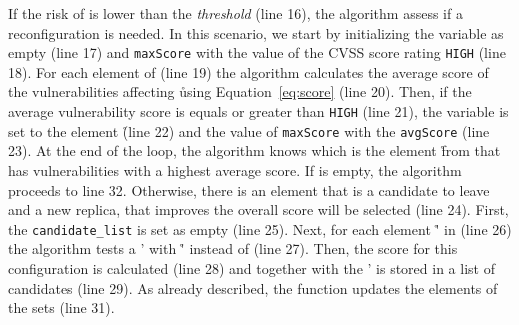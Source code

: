 If the risk of \ES is lower than the \emph{threshold} (line 16), the algorithm assess if a reconfiguration is needed.
In this scenario, we start by initializing the variable \toRemove as empty (line 17) and \texttt{maxScore} with the value of the CVSS score rating \texttt{HIGH} (line 18).
For each element of \ES (line 19) the algorithm calculates the average score of the vulnerabilities affecting \r using Equation~\ref{eq:score} (line 20).
Then, if the average vulnerability score is equals or greater than \texttt{HIGH} (line 21), the variable \toRemove is set to the element \r (line 22) and the value of \texttt{maxScore} with the \texttt{avgScore} (line 23).
At the end of the loop, the algorithm knows which is the element \r from \ES that has vulnerabilities with a highest average score.
If \toRemove is empty, the algorithm proceeds to line 32. 
Otherwise, there is an element that is a candidate to leave \ES and a new replica, that improves the overall score will be selected (line 24).
First, the \texttt{candidate\_list} is set as empty (line 25).
Next, for each element \r' in \RS (line 26) the algorithm tests a \ES' with \r' instead of \toRemove (line 27).
Then, the score for this configuration is calculated (line 28) and together with the \ES' is stored in a list of candidates (line 29).
As already described, the function \Replace updates the elements of the sets (line 31).


